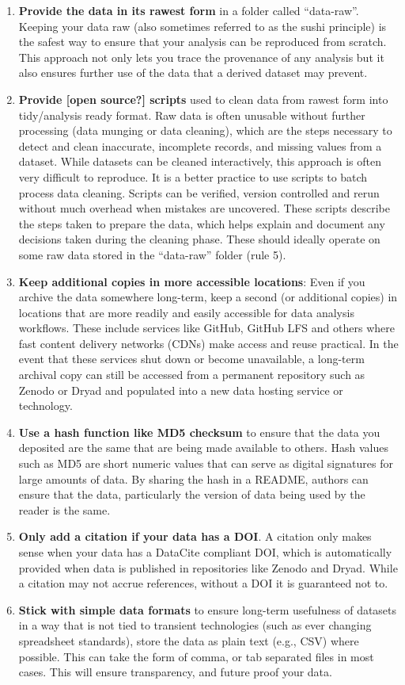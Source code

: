 \documentclass[
]{article}
\begin{document}
\begin{enumerate}
\item
  \textbf{Provide the data in its rawest form} in a folder called ``data-raw''. Keeping your data raw (also sometimes referred to as the sushi principle) is the safest way to ensure that your analysis can be reproduced from scratch. This approach not only lets you trace the provenance of any analysis but it also ensures further use of the data that a derived dataset may prevent.
\item
  \textbf{Provide {[}open source?{]} scripts} used to clean data from rawest form into tidy/analysis ready format. Raw data is often unusable without further processing (data munging or data cleaning), which are the steps necessary to detect and clean inaccurate, incomplete records, and missing values from a dataset. While datasets can be cleaned interactively, this approach is often very difficult to reproduce. It is a better practice to use scripts to batch process data cleaning. Scripts can be verified, version controlled and rerun without much overhead when mistakes are uncovered. These scripts describe the steps taken to prepare the data, which helps explain and document any decisions taken during the cleaning phase. These should ideally operate on some raw data stored in the ``data-raw'' folder (rule 5).
\item
  \textbf{Keep additional copies in more accessible locations}: Even if you archive the data somewhere long-term, keep a second (or additional copies) in locations that are more readily and easily accessible for data analysis workflows. These include services like GitHub, GitHub LFS and others where fast content delivery networks (CDNs) make access and reuse practical. In the event that these services shut down or become unavailable, a long-term archival copy can still be accessed from a permanent repository such as Zenodo or Dryad and populated into a new data hosting service or technology.
\item
  \textbf{Use a hash function like MD5 checksum} to ensure that the data you deposited are the same that are being made available to others. Hash values such as MD5 are short numeric values that can serve as digital signatures for large amounts of data. By sharing the hash in a README, authors can ensure that the data, particularly the version of data being used by the reader is the same.
\item
  \textbf{Only add a citation if your data has a DOI}. A citation only makes sense when your data has a DataCite compliant DOI, which is automatically provided when data is published in repositories like Zenodo and Dryad. While a citation may not accrue references, without a DOI it is guaranteed not to.
\item
  \textbf{Stick with simple data formats} to ensure long-term usefulness of datasets in a way that is not tied to transient technologies (such as ever changing spreadsheet standards), store the data as plain text (e.g., CSV) where possible. This can take the form of comma, or tab separated files in most cases. This will ensure transparency, and future proof your data.
\end{enumerate}
\end{document}
